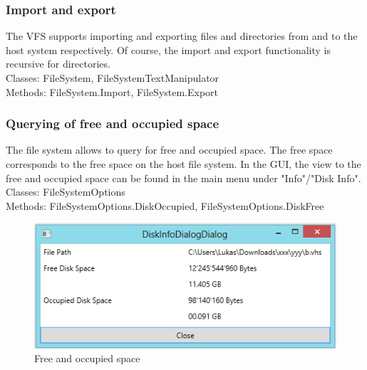 \documentclass[JCDReport.tex]{subfiles}
\begin{document}
\subsubsection{Import and export}
The VFS supports importing and exporting files and directories from and to the host system respectively. Of course, the import and export functionality is recursive for directories.\\
Classes: FileSystem, FileSystemTextManipulator\\
Methods: FileSystem.Import, FileSystem.Export\\

\subsubsection{Querying of free and occupied space}
The file system allows to query for free and occupied space. The free space corresponds to the free space on the host file system. In the GUI, the view to the free and occupied space can be found in the main menu under "Info"/"Disk Info".\\
Classes: FileSystemOptions\\
Methods: FileSystemOptions.DiskOccupied, FileSystemOptions.DiskFree\\
\begin{figure}[h!]
	\centering
	\includegraphics[scale=1]{Images/free_and_occupied_space.png} 
	\caption{Free and occupied space}
\end{figure}

\end{document}
